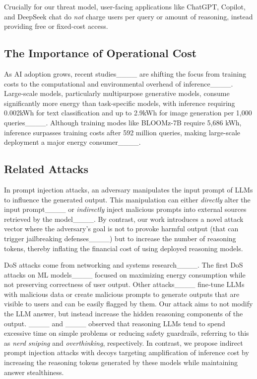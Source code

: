 Crucially for our threat model, user-facing applications like ChatGPT, Copilot, and DeepSeek chat do \emph{not} charge users per query or amount of reasoning, instead providing free or fixed-cost access.









\subsection{The Importance of Operational Cost}

As AI adoption grows, recent studies____ are shifting the focus from training costs to the computational and environmental overhead of inference____. Large-scale models, particularly multipurpose generative models, consume significantly more energy than task-specific models, with inference requiring 0.002kWh for text classification and up to 2.9kWh for image generation per 1,000 queries____. Although training modes like BLOOMz-7B require 5,686 kWh, inference surpasses training costs after 592 million queries, making large-scale deployment a major energy consumer____. 









\subsection{Related Attacks}

 In prompt injection attacks, an adversary manipulates the input prompt of LLMs to influence the generated output. This manipulation can either \emph{directly} alter the input prompt____ or \emph{indirectly} inject malicious prompts into external sources retrieved by the model____. By contrast, our work introduces a novel attack vector where the adversary's goal is not to provoke harmful output (that can trigger jailbreaking defenses____) but to increase the number of reasoning tokens, thereby inflating the financial cost of using deployed reasoning models.



 DoS attacks come from networking and systems research____. The first DoS attacks on ML models____ focused on maximizing energy consumption while not preserving correctness of user output. Other attacks____ fine-tune LLMs with malicious data or create malicious prompts to generate outputs that are visible to users and can be easily flagged by them. Our attack aims to not modify the LLM answer,  but instead increase the hidden reasoning components of the output. ____ and ____ observed that reasoning LLMs tend to spend excessive time on simple problems or reducing safety guardrails, referring to this as \textit{nerd sniping} and \textit{overthinking}, respectively. In contrast, we propose indirect prompt injection attacks with decoys targeting amplification of inference cost by increasing the reasoning tokens generated by these models while maintaining answer stealthiness.